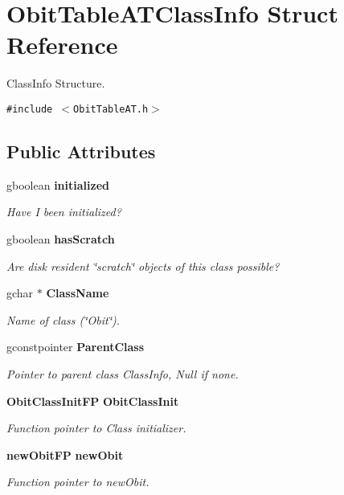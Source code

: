 \section{Obit\-Table\-ATClass\-Info Struct Reference}
\label{structObitTableATClassInfo}
Class\-Info Structure.  


{\tt \#include $<$Obit\-Table\-AT.h$>$}

\subsection*{Public Attributes}
\begin{CompactItemize}
\item 
gboolean {\bf initialized}
\begin{CompactList}\small\item\em Have I been initialized? \item\end{CompactList}\item 
gboolean {\bf has\-Scratch}
\begin{CompactList}\small\item\em Are disk resident \char`\"{}scratch\char`\"{} objects of this class possible? \item\end{CompactList}\item 
gchar $\ast$ {\bf Class\-Name}
\begin{CompactList}\small\item\em Name of class (\char`\"{}Obit\char`\"{}). \item\end{CompactList}\item 
gconstpointer {\bf Parent\-Class}
\begin{CompactList}\small\item\em Pointer to parent class Class\-Info, Null if none. \item\end{CompactList}\item 
{\bf Obit\-Class\-Init\-FP} {\bf Obit\-Class\-Init}
\begin{CompactList}\small\item\em Function pointer to Class initializer. \item\end{CompactList}\item 
{\bf new\-Obit\-FP} {\bf new\-Obit}
\begin{CompactList}\small\item\em Function pointer to new\-Obit. \item\end{CompactList}\item 

\end{CompactItemize}
